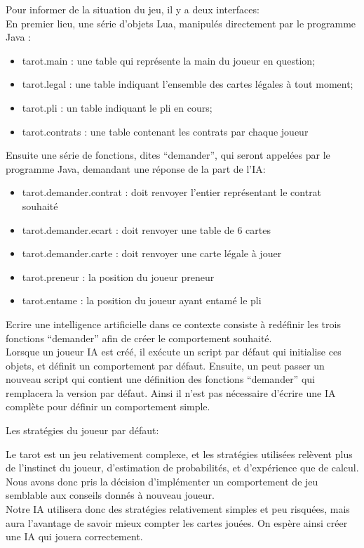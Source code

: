 \documentclass[a4paper]{report}
\begin{document}
			Pour informer de la situation du jeu, il y a deux interfaces:\\

			En premier lieu, une série d'objets Lua, manipulés directement par le programme Java :\\
			\begin{itemize}

			\item tarot.main : une table qui représente la main du joueur en question;

			\item tarot.legal : une table indiquant l’ensemble des cartes légales à tout moment;

			\item tarot.pli : un table indiquant le pli en cours;

			\item tarot.contrats : une table contenant les contrats par chaque joueur
			\end{itemize}
			Ensuite une série de fonctions, dites “demander”, qui seront appelées par le programme Java, demandant une réponse de la part de l’IA:\\
			\begin{itemize}
			    \item tarot.demander.contrat : doit renvoyer l’entier représentant le contrat souhaité
			    \item tarot.demander.ecart : doit renvoyer une table de 6 cartes
			    \item tarot.demander.carte : doit renvoyer une carte légale à jouer
				\item tarot.preneur : la position du joueur preneur
				\item tarot.entame : la position du joueur ayant entamé le pli
			\end{itemize}
			Ecrire une intelligence artificielle dans ce contexte consiste à redéfinir les trois fonctions “demander” afin de créer le comportement souhaité.\\

			Lorsque un joueur IA est créé, il exécute un script par défaut qui initialise ces objets, et définit un comportement par défaut. Ensuite, un peut passer un nouveau script qui 				contient une définition des fonctions “demander” qui remplacera la version par défaut. Ainsi il n’est pas nécessaire d’écrire une IA complète pour définir un comportement simple.


Les stratégies du joueur par défaut:

Le tarot est un jeu relativement complexe, et les stratégies utilisées relèvent plus de l’instinct du joueur, d’estimation de probabilités, et d’expérience que de calcul. Nous avons donc pris la décision d'implémenter un comportement de jeu semblable aux conseils donnés à nouveau joueur.\\
Notre IA utilisera donc des stratégies relativement simples et peu risquées, mais aura l’avantage de savoir mieux compter les cartes jouées. On espère ainsi créer une IA qui jouera correctement.\\
\end{document}
